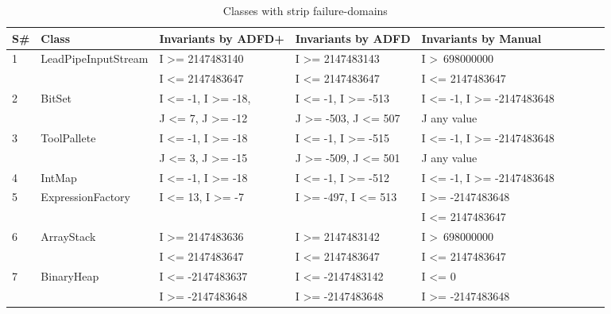 {\scriptsize
\begin{longtable}{|l|l|l|l|l|l|l|l|l|}
  \caption{Classes with strip failure-domains}\\
  
  \hline
S\#  & Class						& Invariants by ADFD+       					& Invariants by ADFD     					& Invariants by Manual	\\
  \hline
  \endhead
1	&LeadPipeInputStream 		& I \textgreater= 2147483140				& I \textgreater= 2147483143			& I \textgreater~698000000					\\ 
	&                                             & I \textless= 2147483647  					& I \textless= 2147483647 				& I \textless= 2147483647					\\
2	& BitSet				  		& I \textless= -1, I \textgreater= -18,			& I \textless= -1, I \textgreater= -513		& I \textless= -1, I \textgreater= -2147483648	\\ 
	&                                             & J \textless= 7, J \textgreater= -12  			& J \textgreater= -503, J \textless= 507	& J any value									\\ %
3	& ToolPallete			  		& I \textless= -1, I \textgreater= -18			& I \textless= -1, I \textgreater= -515		& I \textless= -1, I \textgreater= -2147483648	\\ 
	&                                             & J \textless= 3, J \textgreater= -15			& J \textgreater= -509, J \textless= 501	& J any value			   						\\
4	& IntMap			  		& I \textless= -1, I \textgreater= -18			& I \textless= -1, I \textgreater= -512		& I \textless= -1, I \textgreater= -2147483648	\\
5	& ExpressionFactory	  		& I \textless= 13, I \textgreater= -7			& I \textgreater= -497, I \textless= 513	& I \textgreater= -2147483648 				\\ %
	&                                             & 											&										& I \textless= 2147483647					\\
6	& ArrayStack					& I \textgreater= 2147483636				& I \textgreater= 2147483142			& I \textgreater~698000000 					\\ 
	&                                             & I \textless= 2147483647 					& I \textless= 2147483647 				& I \textless= 2147483647 					\\
7	& BinaryHeap				& I \textless= -2147483637					& I \textless= -2147483142				& I \textless= 0								 \\	
	&                                             & I \textgreater= -2147483648				& I \textgreater= -2147483648			& I \textgreater= -2147483648				\\

\end{longtable}}
